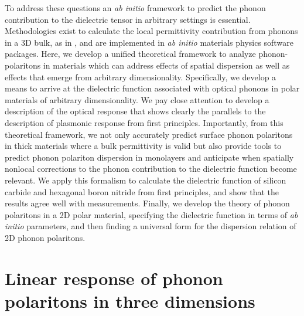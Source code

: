\documentclass[aps,prb,twocolumn,
	groupedaddress,superscriptaddress,
	amsfonts,amssymb,amsmath,floatfix,
	citeautoscript]{revtex4-1}
\begin{document}
To address these questions an \emph{ab initio} framework to predict the phonon contribution to the dielectric tensor in arbitrary settings is essential. Methodologies exist to calculate the local permittivity contribution from phonons in a 3D bulk, as in \cite{Gonze1997dynamical}, and are implemented in \emph{ab initio} materials physics software packages\cite{abinit1,abinit2,abinit3}. Here, we develop a unified 
theoretical framework to analyze phonon-polaritons in materials which can address effects of spatial dispersion as well as effects that emerge from arbitrary dimensionality. Specifically, we develop a means to arrive at the dielectric function associated with optical phonons in polar materials of arbitrary dimensionality. We pay close attention to develop a description of the optical response that shows clearly the parallels to the description of plasmonic response from first principles. Importantly, from this theoretical framework, we not only accurately predict surface phonon polaritons in thick materials where a bulk permittivity is valid but also provide tools to predict phonon polariton dispersion in monolayers and anticipate when spatially nonlocal corrections to the phonon contribution to the dielectric function become relevant. We apply this formalism to calculate the dielectric function of silicon carbide and hexagonal boron nitride from first principles, and show that the results agree well with measurements. Finally, we develop the theory of phonon polaritons in a 2D polar material, specifying the dielectric function in terms of \emph{ab initio} parameters, and then finding a universal form for the dispersion relation of 2D phonon polaritons.

\section{Linear response of phonon polaritons in three dimensions}
\end{document}
